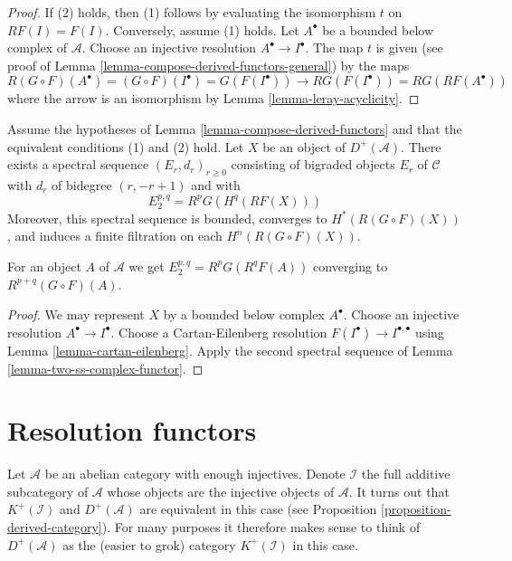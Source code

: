 \begin{proof}
If (2) holds, then (1) follows by evaluating the isomorphism
$t$ on $RF(I) = F(I)$. Conversely, assume (1) holds.
Let $A^\bullet$ be a bounded below complex of $\mathcal{A}$.
Choose an injective resolution $A^\bullet \to I^\bullet$.
The map $t$ is given (see proof of
Lemma \ref{lemma-compose-derived-functors-general})
by the maps
$$
R(G \circ F)(A^\bullet) =
(G \circ F)(I^\bullet) =
G(F(I^\bullet)) \to
RG(F(I^\bullet)) =
RG(RF(A^\bullet))
$$
where the arrow is an isomorphism by
Lemma \ref{lemma-leray-acyclicity}.
\end{proof}

\begin{lemma}
\label{lemma-grothendieck-spectral-sequence}
Assume the hypotheses of Lemma \ref{lemma-compose-derived-functors}
and that the equivalent conditions (1) and (2) hold.
Let $X$ be an object of $D^{+}(\mathcal{A})$.
There exists a spectral sequence $(E_r, d_r)_{r \geq 0}$
consisting of bigraded objects $E_r$ of $\mathcal{C}$ with
$d_r$ of bidegree $(r, - r + 1)$ and with
$$
E_2^{p, q} = R^pG(H^q(RF(X)))
$$
Moreover, this spectral sequence is bounded, converges to
$H^*(R(G \circ F)(X))$, and induces a finite filtration
on each $H^n(R(G \circ F)(X))$.
\end{lemma}

\noindent
For an object $A$ of $\mathcal{A}$ we get
$E_2^{p, q} = R^pG(R^qF(A))$ converging to $R^{p + q}(G \circ F)(A)$.

\begin{proof}
We may represent $X$ by a bounded below complex $A^\bullet$.
Choose an injective resolution $A^\bullet \to I^\bullet$.
Choose a Cartan-Eilenberg resolution
$F(I^\bullet) \to I^{\bullet, \bullet}$ using
Lemma \ref{lemma-cartan-eilenberg}.
Apply the second spectral sequence of
Lemma \ref{lemma-two-ss-complex-functor}.
\end{proof}






\section{Resolution functors}
\label{section-derived-category}

\noindent
Let $\mathcal{A}$ be an abelian category with enough injectives.
Denote $\mathcal{I}$ the full additive subcategory of $\mathcal{A}$ whose
objects are the injective objects of $\mathcal{A}$.
It turns out that $K^{+}(\mathcal{I})$ and $D^{+}(\mathcal{A})$
are equivalent in this case (see
Proposition \ref{proposition-derived-category}).
For many purposes it therefore makes sense to think of
$D^{+}(\mathcal{A})$ as the (easier to grok) category $K^{+}(\mathcal{I})$
in this case.

